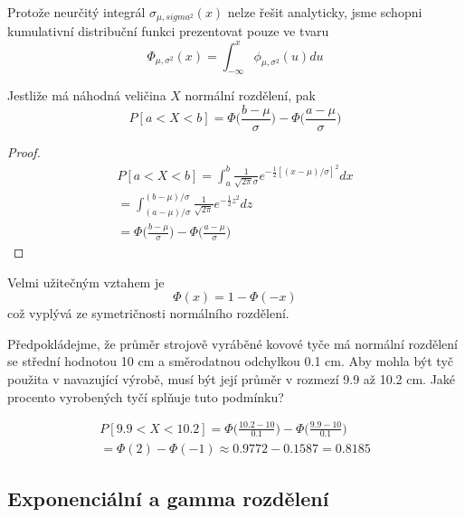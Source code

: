 \begin{theorem}
Protože neurčitý integrál $\sigma_{\mu, sigma^2}(x)$ nelze řešit analyticky, jsme schopni kumulativní distribuční funkci prezentovat pouze ve tvaru
\begin{equation*}
\Phi_{\mu, \sigma^2}(x) = \int_{-\infty}^x \phi_{\mu, \sigma^2}(u)du
\end{equation*}
\end{theorem}
\begin{theorem}
Jestliže má náhodná veličina $X$ normální rozdělení, pak
\begin{equation*}
P[a < X < b] = \Phi \Big(\frac{b - \mu}{\sigma}\Big) - \Phi \Big(\frac{a - \mu}{\sigma}\Big)
\end{equation*}
\end{theorem}
\begin{proof}
\begin{gather*}
P[a < X < b] = \int_a^b \frac{1}{\sqrt{2 \pi} \sigma} e^{-\frac{1}{2}[(x - \mu)/\sigma]^2}dx\\
= \int_{(a - \mu)/\sigma}^{(b - \mu)/\sigma} \frac{1}{\sqrt{2 \pi}} e^{-\frac{1}{2}z^2}dz\\
= \Phi \Big(\frac{b - \mu}{\sigma}\Big) - \Phi \Big(\frac{a - \mu}{\sigma}\Big)
\end{gather*}
\end{proof}

\begin{theorem}
Velmi užitečným vztahem je
\begin{equation*}
\Phi(x) = 1 - \Phi(-x)
\end{equation*}
což vyplývá ze symetričnosti normálního rozdělení.
\end{theorem}

\begin{example}
Předpokládejme, že průměr strojově vyráběné kovové tyče má normální rozdělení se střední hodnotou 10 cm a směrodatnou odchylkou 0.1 cm. Aby mohla být tyč použita v navazující výrobě, musí být její průměr v rozmezí 9.9 až 10.2 cm. Jaké procento vyrobených tyčí splňuje tuto podmínku?

\begin{gather*}
P[9.9 < X < 10.2] = \Phi \Big(\frac{10.2 - 10}{0.1} \Big) - \Phi \Big(\frac{9.9 - 10}{0.1} \Big)\\
= \Phi(2) - \Phi(-1) \approx 0.9772 - 0.1587 = 0.8185
\end{gather*}
\end{example}

\subsection{Exponenciální a gamma rozdělení}

